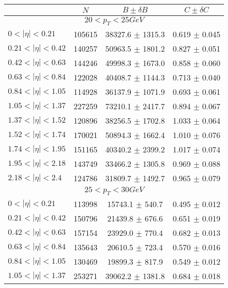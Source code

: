\begin{tabular}{lccc}
\hline
    &   $N$   & $B \pm \delta B$  &  $C \pm \delta C$ \\
\hline
\hline
\multicolumn{4}{c}{$20 < p_{T} < 25 GeV$} \\
\hline
$0 < |\eta| <0.21$             & 105615     & 38327.6    $\pm$ 1315.3 & 0.619      $\pm$ 0.045 \\
$0.21 < |\eta| <0.42$          & 140257     & 50963.5    $\pm$ 1801.2 & 0.827      $\pm$ 0.051 \\
$0.42 < |\eta| <0.63$          & 144246     & 49998.3    $\pm$ 1673.0 & 0.858      $\pm$ 0.060 \\
$0.63 < |\eta| <0.84$          & 122028     & 40408.7    $\pm$ 1144.3 & 0.713      $\pm$ 0.040 \\
$0.84 < |\eta| <1.05$          & 114928     & 36137.9    $\pm$ 1071.9 & 0.693      $\pm$ 0.061 \\
$1.05 < |\eta| <1.37$          & 227259     & 73210.1    $\pm$ 2417.7 & 0.894      $\pm$ 0.067 \\
$1.37 < |\eta| <1.52$          & 120896     & 38256.5    $\pm$ 1702.8 & 1.033      $\pm$ 0.064 \\
$1.52 < |\eta| <1.74$          & 170021     & 50894.3    $\pm$ 1662.4 & 1.010      $\pm$ 0.076 \\
$1.74 < |\eta| <1.95$          & 151165     & 40340.2    $\pm$ 2399.2 & 1.017      $\pm$ 0.074 \\
$1.95 < |\eta| <2.18$          & 143749     & 33466.2    $\pm$ 1305.8 & 0.969      $\pm$ 0.088 \\
$2.18 < |\eta| <2.4$           & 124786     & 31809.7    $\pm$ 1492.7 & 0.965      $\pm$ 0.079 \\
\hline
\multicolumn{4}{c}{$25 < p_{T} < 30 GeV$} \\
\hline
$0 < |\eta| <0.21$             & 113998     & 15743.1    $\pm$ 540.7 & 0.495      $\pm$ 0.012 \\
$0.21 < |\eta| <0.42$          & 150796     & 21439.8    $\pm$ 676.6 & 0.651      $\pm$ 0.019 \\
$0.42 < |\eta| <0.63$          & 157154     & 23929.0    $\pm$ 770.4 & 0.682      $\pm$ 0.013 \\
$0.63 < |\eta| <0.84$          & 135643     & 20610.5    $\pm$ 723.4 & 0.570      $\pm$ 0.016 \\
$0.84 < |\eta| <1.05$          & 130469     & 19899.3    $\pm$ 817.9 & 0.549      $\pm$ 0.012 \\
$1.05 < |\eta| <1.37$          & 253271     & 39062.2    $\pm$ 1381.8 & 0.684      $\pm$ 0.018 \\

\end{tabular}

